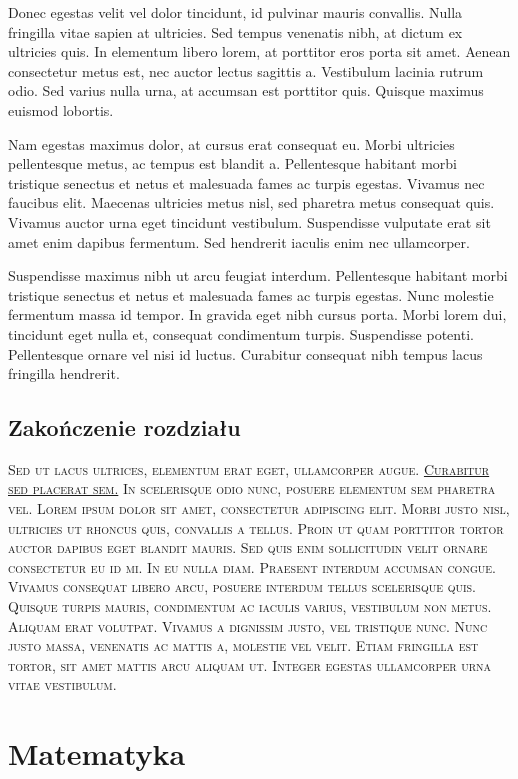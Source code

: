 \documentclass{article}
\begin{document}
Donec egestas velit vel dolor tincidunt, id pulvinar mauris convallis. Nulla fringilla vitae sapien at ultricies. Sed tempus venenatis 
nibh, at dictum ex ultricies quis. In elementum libero lorem, at porttitor eros porta sit amet. Aenean consectetur metus est, nec auctor 
lectus sagittis a. Vestibulum lacinia rutrum odio. Sed varius nulla urna, at accumsan est porttitor quis. Quisque maximus euismod 
lobortis.

Nam egestas maximus dolor, at cursus erat consequat eu. Morbi ultricies pellentesque metus, ac tempus est blandit a. Pellentesque 
habitant morbi tristique senectus et netus et malesuada fames ac turpis egestas. Vivamus nec faucibus elit. Maecenas ultricies metus 
nisl, sed pharetra metus consequat quis. Vivamus auctor urna eget tincidunt vestibulum. Suspendisse vulputate erat sit amet enim dapibus 
fermentum. Sed hendrerit iaculis enim nec ullamcorper.

Suspendisse maximus nibh ut arcu feugiat interdum. Pellentesque habitant morbi tristique senectus et netus et malesuada fames ac turpis 
egestas. Nunc molestie fermentum massa id tempor. In gravida eget nibh cursus porta. Morbi lorem dui, tincidunt eget nulla et, consequat 
condimentum turpis. Suspendisse potenti. Pellentesque ornare vel nisi id luctus. Curabitur consequat nibh tempus lacus fringilla 
hendrerit.


\subsection{Zakończenie rozdziału}
\textsc{Sed ut lacus ultrices, elementum erat eget, ullamcorper augue. \underline{Curabitur sed placerat sem.} In scelerisque odio nunc, 
posuere elementum sem pharetra vel. Lorem ipsum dolor sit amet, consectetur adipiscing elit. Morbi justo nisl, ultricies ut rhoncus 
quis, convallis a tellus. Proin ut quam porttitor tortor auctor dapibus eget blandit mauris. Sed quis enim sollicitudin velit ornare 
consectetur eu id mi. In eu nulla diam. Praesent interdum accumsan congue. Vivamus consequat libero arcu, posuere interdum tellus 
scelerisque quis. Quisque turpis mauris, condimentum ac iaculis varius, vestibulum non metus. Aliquam erat volutpat. Vivamus a dignissim 
justo, vel tristique nunc. Nunc justo massa, venenatis ac mattis a, molestie vel velit. Etiam fringilla est tortor, sit amet mattis arcu 
aliquam ut. Integer egestas ullamcorper urna vitae vestibulum.}

\section{Matematyka}
\end{document}
